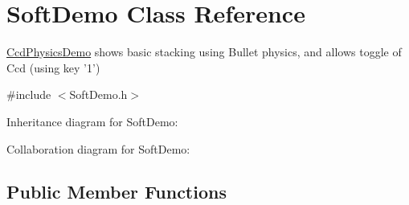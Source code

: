 \hypertarget{class_soft_demo}{\section{Soft\+Demo Class Reference}
\label{class_soft_demo}
}


\hyperlink{class_ccd_physics_demo}{Ccd\+Physics\+Demo} shows basic stacking using Bullet physics, and allows toggle of Ccd (using key '1')  




{\ttfamily \#include $<$Soft\+Demo.\+h$>$}



Inheritance diagram for Soft\+Demo\+:


Collaboration diagram for Soft\+Demo\+:
\subsection*{Public Member Functions}
